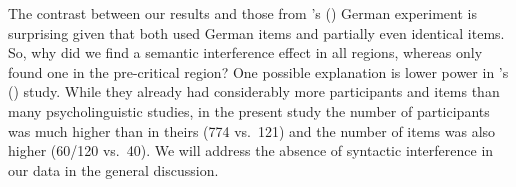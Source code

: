 \documentclass[a4paper, man, floatsintext]{apa7}
\begin{document}
The contrast between our results and those from  \citeauthor{mertzen}'s (\citeyear{mertzen}) German experiment is surprising given that both used German items and partially even identical items. So, why did we find a semantic interference effect in all regions, whereas \citet{mertzen} only found one in the pre-critical region? One possible explanation is lower power in \citeauthor{mertzen}'s (\citeyear{mertzen}) study. While they already had considerably more participants and items than many psycholinguistic studies, in the present study the number of participants was much higher than in theirs (774 vs.\ 121) and the number of items was also higher (60/120 vs.\ 40). 
We will address the absence of syntactic interference in our data in the general discussion.


\end{document}
